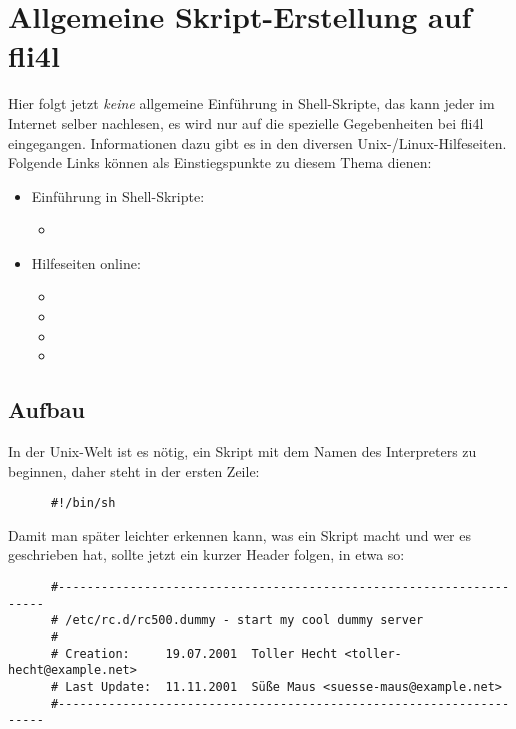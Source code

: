 
\section{Allgemeine Skript-Erstellung auf fli4l}


Hier folgt jetzt \emph{keine} allgemeine Einführung in Shell-Skripte, das
kann jeder im Internet selber nachlesen, es wird nur auf die spezielle
Gegebenheiten bei fli4l eingegangen. Informationen dazu gibt es in den diversen
Unix-/Linux-Hilfeseiten. Folgende Links können als Einstiegspunkte zu
diesem Thema dienen:
\begin{itemize}
\item Einführung in Shell-Skripte:
  \begin{itemize}
  \item {}
  \end{itemize}
 \item
   Hilfeseiten online:
   \begin{itemize}
   \item {}
   \item {}
   \item {}
   \item {}
   \end{itemize}
\end{itemize}

\subsection{Aufbau}

    In der Unix-Welt ist es nötig, ein Skript mit dem Namen des Interpreters
    zu beginnen, daher steht in der ersten Zeile:
\begin{example}
\begin{verbatim}
      #!/bin/sh
\end{verbatim}
\end{example}

    Damit man später leichter erkennen kann, was ein Skript macht und wer es
    geschrieben hat, sollte jetzt ein kurzer Header folgen, in etwa so:

\begin{example}
\begin{verbatim}
      #--------------------------------------------------------------------
      # /etc/rc.d/rc500.dummy - start my cool dummy server
      #
      # Creation:     19.07.2001  Toller Hecht <toller-hecht@example.net>
      # Last Update:  11.11.2001  Süße Maus <suesse-maus@example.net>
      #--------------------------------------------------------------------
\end{verbatim}
\end{example}

